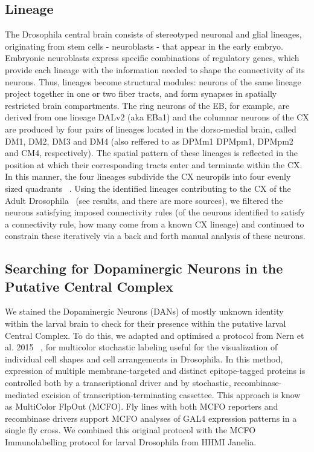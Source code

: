 \documentclass{article}
\begin{document}
 \subsection{Lineage}
 The Drosophila central brain consists of stereotyped neuronal and glial lineages, originating from stem cells - neuroblasts - that appear in the early embryo. Embryonic neuroblasts express specific combinations of regulatory genes, which provide each lineage with the information needed to shape the connectivity of its neurons. %
 Thus, lineages become structural modules: neurons of the same lineage project together in one or two fiber tracts, and form synapses in spatially restricted brain compartments. The ring neurons of the EB, for example, are derived from one lineage DALv2 (aka EBa1) and the columnar neurons of the CX are produced by four pairs of lineages located in the dorso-medial brain, called DM1, DM2, DM3 and DM4 (also reffered to as DPMm1 DPMpm1, DPMpm2 and CM4, respectively). The spatial pattern of these lineages is reflected in the position at which their corresponding tracts enter and terminate within the CX. In this manner, the four lineages subdivide the CX neuropils into four evenly sized quadrants ~\citep{andrade2019developmentally}. Using the identified lineages contributing to the CX of the Adult Drosophila ~\citep{andrade2019developmentally}(see results, and there are more sources), we filtered the neurons satisfying imposed connectivity rules (of the neurons identified to satisfy a connectivity rule, how many come from a known CX lineage) and continued to constrain these iteratively via a back and forth manual analysis of these neurons. 
 
 
\subsection{Searching for Dopaminergic Neurons in the Putative Central Complex}
We stained the Dopaminergic Neurons (DANs) of mostly unknown identity within the larval brain to check for their presence within the putative larval Central Complex. To do this, we adapted and optimised a protocol from Nern et al. 2015 ~\citep{nern2015optimized}, for multicolor stochastic labeling useful for the visualization of individual cell shapes and cell arrangements in Drosophila. In this method, expression of multiple membrane-targeted and distinct epitope-tagged proteins is controlled both by a transcriptional driver and by stochastic, recombinase-mediated excision of transcription-terminating cassettee. This approach is know as MultiColor FlpOut (MCFO). Fly lines with both MCFO reporters and recombinase drivers support MCFO analyses of GAL4 expression patterns in a single fly cross.
We combined this original protocol with the MCFO Immunolabelling protocol for larval Drosophila from HHMI Janelia. 
\end{document}
